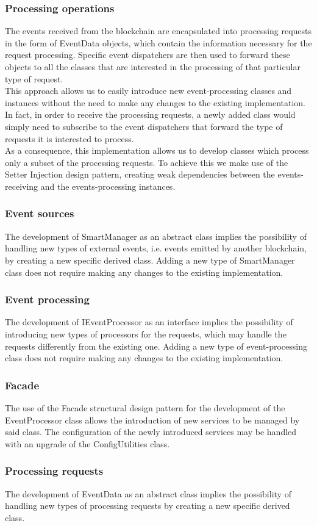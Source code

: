 		\subsubsection{Processing operations}
		The events received from the blockchain are encapsulated into processing requests in the form of EventData objects, which contain the information necessary for the request processing. Specific event dispatchers are then used to forward these objects to all the classes that are interested in the processing of that particular type of request. \\
		This approach allows us to easily introduce new event-processing classes and instances without the need to make any changes to the existing implementation. In fact, in order to receive the processing requests, a newly added class would simply need to subscribe to the event dispatchers that forward the type of requests it is interested to process. \\
		As a consequence, this implementation allows us to develop classes which process only a subset of the processing requests. To achieve this we make use of the Setter Injection design pattern, creating weak dependencies between the events-receiving and the events-processing instances.
		\subsubsection{Event sources}
		The development of SmartManager as an abstract class implies the possibility of handling new types of external events, i.e. events emitted by another blockchain, by creating a new specific derived class. Adding a new type of SmartManager class does not require making any changes to the existing implementation.
		\subsubsection{Event processing}
		The development of IEventProcessor as an interface implies the possibility of introducing new types of processors for the requests, which may handle the requests differently from the existing one. Adding a new type of event-processing class does not require making any changes to the existing implementation.
		\subsubsection{Facade}
		The use of the Facade structural design pattern for the development of the EventProcessor class allows the introduction of new services to be managed by said class. The configuration of the newly introduced services may be handled with an upgrade of the ConfigUtilities class.
		\subsubsection{Processing requests}
		The development of EventData as an abstract class implies the possibility of handling new types of processing requests by creating a new specific derived class.
